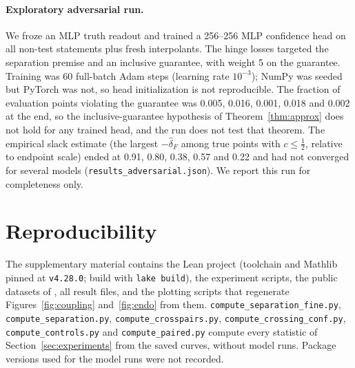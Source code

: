 \documentclass[10pt]{article}
\theoremstyle{definition}
\theoremstyle{remark}
\newcommand{\conf}{c}
\newcommand{\dFhat}{\hat\delta_{\!F}}
\begin{document}
\paragraph{Exploratory adversarial run.}
We froze an MLP truth readout and trained a 256--256 MLP confidence head
on all non-test statements plus fresh interpolants. The hinge losses
targeted the separation premise and an inclusive guarantee, with weight
5 on the guarantee. Training was 60 full-batch Adam steps (learning rate
$10^{-3}$); NumPy was seeded but PyTorch was not, so head initialization
is not reproducible. The fraction of evaluation points
violating the guarantee was 0.005, 0.016, 0.001, 0.018 and 0.002 at the
end, so the inclusive-guarantee hypothesis of Theorem~\ref{thm:approx}
does not hold for any trained head, and the run does not test that
theorem. The empirical slack estimate (the largest $-\dFhat$ among true
points with $\conf\le\tfrac12$, relative to endpoint scale) ended at
0.91, 0.80, 0.38, 0.57 and 0.22 and had not converged for several models
(\texttt{results\_adversarial.json}). We report this run for
completeness only.

\section{Reproducibility}
\label{app:artifact}

The supplementary material contains the Lean project (toolchain and
Mathlib pinned at \texttt{v4.28.0}; build with \texttt{lake build}), the
experiment scripts, the public datasets of \citet{marks2024geometry}, all
result files, and the plotting scripts that regenerate
Figures~\ref{fig:coupling} and~\ref{fig:endo} from them.
\texttt{compute\_separation\_fine.py}, \texttt{compute\_separation.py},
\texttt{compute\_crosspairs.py},
\texttt{compute\_crossing\_conf.py}, \texttt{compute\_controls.py} and
\texttt{compute\_paired.py} compute
every statistic of Section~\ref{sec:experiments} from the saved curves,
without model runs. Package versions used for the model runs were not recorded.
\end{document}
